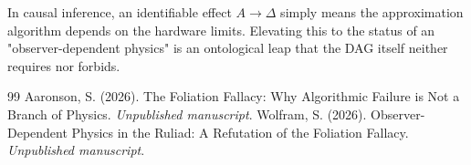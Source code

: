 \documentclass[12pt,a4paper]{article}
\begin{document}
In causal inference, an identifiable effect $A \rightarrow \Delta$ simply means the approximation algorithm depends on the hardware limits. Elevating this to the status of an "observer-dependent physics" is an ontological leap that the DAG itself neither requires nor forbids.

\begin{thebibliography}{99}
 Aaronson, S. (2026). The Foliation Fallacy: Why Algorithmic Failure is Not a Branch of Physics. \emph{Unpublished manuscript}.
 Wolfram, S. (2026). Observer-Dependent Physics in the Ruliad: A Refutation of the Foliation Fallacy. \emph{Unpublished manuscript}.
\end{thebibliography}
\end{document}
